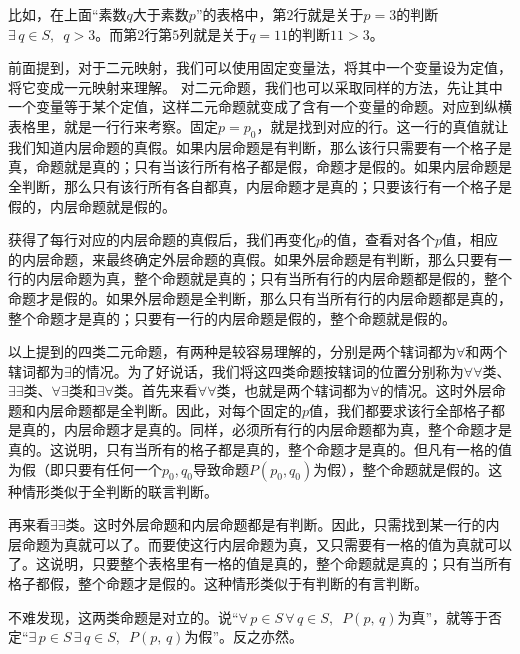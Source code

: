 \documentclass[12pt,UTF8,fontset=none]{ctexbook}
\begin{document}
比如，在上面“素数$q$大于素数$p$”的表格中，第$2$行就是关于$p=3$的判断$\exists \,q\in S, \,\,\, q > 3$。而第$2$行第$5$列就是关于$q=11$的判断$11 > 3$。

前面提到，对于二元映射，我们可以使用固定变量法，将其中一个变量设为定值，将它变成一元映射来理解。
对二元命题，我们也可以采取同样的方法，先让其中一个变量等于某个定值，这样二元命题就变成了含有一个变量的命题。对应到纵横表格里，就是一行行来考察。固定$p = p_0$，就是找到对应的行。这一行的真值就让我们知道内层命题的真假。如果内层命题是有判断，那么该行只需要有一个格子是真，命题就是真的；只有当该行所有格子都是假，命题才是假的。如果内层命题是全判断，那么只有该行所有各自都真，内层命题才是真的；只要该行有一个格子是假的，内层命题就是假的。

获得了每行对应的内层命题的真假后，我们再变化$p$的值，查看对各个$p$值，相应的内层命题，来最终确定外层命题的真假。如果外层命题是有判断，那么只要有一行的内层命题为真，整个命题就是真的；只有当所有行的内层命题都是假的，整个命题才是假的。如果外层命题是全判断，那么只有当所有行的内层命题都是真的，整个命题才是真的；只要有一行的内层命题是假的，整个命题就是假的。

以上提到的四类二元命题，有两种是较容易理解的，分别是两个辖词都为$\forall$和两个辖词都为$\exists$的情况。为了好说话，我们将这四类命题按辖词的位置分别称为$\forall\forall$类、$\exists\exists$类、$\forall\exists$类和$\exists\forall$类。首先来看$\forall\forall$类，也就是两个辖词都为$\forall$的情况。这时外层命题和内层命题都是全判断。因此，对每个固定的$p$值，我们都要求该行全部格子都是真的，内层命题才是真的。同样，必须所有行的内层命题都为真，整个命题才是真的。这说明，只有当所有的格子都是真的，整个命题才是真的。但凡有一格的值为假（即只要有任何一个$p_0,q_0$导致命题$P(p_0,q_0)$为假），整个命题就是假的。这种情形类似于全判断的联言判断。

再来看$\exists\exists$类。这时外层命题和内层命题都是有判断。因此，只需找到某一行的内层命题为真就可以了。而要使这行内层命题为真，又只需要有一格的值为真就可以了。这说明，只要整个表格里有一格的值是真的，整个命题就是真的；只有当所有格子都假，整个命题才是假的。这种情形类似于有判断的有言判断。

不难发现，这两类命题是对立的。说“$\forall \, p\in S \, \forall \,q\in S, \,\,\, P(p,\,q)$为真”，就等于否定“$\exists \, p\in S \, \exists \,q\in S, \,\,\, P(p,\,q)$为假”。反之亦然。
\end{document}
